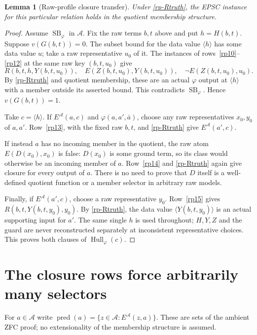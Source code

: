 \documentclass[11pt]{article}
\newtheorem{lemma}[theorem]{Lemma}
\newcommand{\cl}[1]{\langle#1\rangle}
\begin{document}
\begin{lemma}[Raw-profile closure transfer]\label{rp-transfer}
Under \eqref{rp-Rtruth}, the EPSC instance for this particular relation
holds in the quotient membership structure.
\end{lemma}
\begin{proof}
Assume $\operatorname{SB}_\varphi$ in $\mathcal A$. Fix the raw terms
$b,t$ above and put $h=H(b,t)$. Suppose $v(G(b,t))=0$. The subset
bound for the data value $\cl h$ has some data value $u$; take a raw
representative $u_0$ of it. The instances of rows~\ref{rp10}--\ref{rp12}
at the same raw key $(b,t,u_0)$ give
\[
 R(b,t,h,Y(b,t,u_0)),\quad
 E(Z(b,t,u_0),Y(b,t,u_0)),\quad
 \neg E(Z(b,t,u_0),u_0).
\]
By \eqref{rp-Rtruth} and quotient membership, these are an actual
$\varphi$ output at $\cl h$ with a member outside its asserted bound.
This contradicts $\operatorname{SB}_\varphi$. Hence $v(G(b,t))=1$.

Take $c=\cl h$. If $E^{\mathcal A}(a,c)$ and
$\varphi(a,a',\bar a)$, choose any raw representatives $x_0,y_0$ of
$a,a'$. Row~\ref{rp13}, with the fixed raw $b,t$, and
\eqref{rp-Rtruth} give $E^{\mathcal A}(a',c)$.

If instead $a$ has no incoming member in the quotient, the raw atom
$E(D(x_0),x_0)$ is false: $D(x_0)$ is some ground term, so its class
would otherwise be an incoming member of $a$. Row~\ref{rp14} and
\eqref{rp-Rtruth} again give closure for every output of $a$.
There is no need to prove that $D$ itself is a well-defined quotient
function or a member selector in arbitrary raw models.

Finally, if $E^{\mathcal A}(a',c)$, choose a raw representative
$y_0$. Row~\ref{rp15} gives
$R(b,t,Y(b,t,y_0),y_0)$. By \eqref{rp-Rtruth}, the data value
$\cl{Y(b,t,y_0)}$ is an actual supporting input for $a'$.
The same single $h$ is used throughout; $H,Y,Z$ and the guard are
never reconstructed separately at inconsistent representative choices.
This proves both clauses of $\operatorname{Hull}_\varphi(c)$.
\end{proof}

\section{The closure rows force arbitrarily many selectors}\label{rp-infinity}

For $a\in\mathcal A$ write
$\operatorname{pred}(a)=\{z\in\mathcal A:E^{\mathcal A}(z,a)\}$.
These are sets of the ambient ZFC proof; no extensionality of the
membership structure is assumed.
\end{document}
